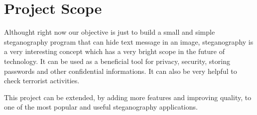 \section{Project Scope}

Althought right now our objective is just to build a small and simple
steganography program that can hide text message in an image, steganography is
a very interesting concept which has a very bright scope in the future of
technology. It can be used as a beneficial tool for privacy, security, storing
passwords and other confidential informations. It can also be very helpful to
check terrorist activities.

This project can be extended, by adding more features and improving quality,
to one of the most popular and useful steganography applications.
